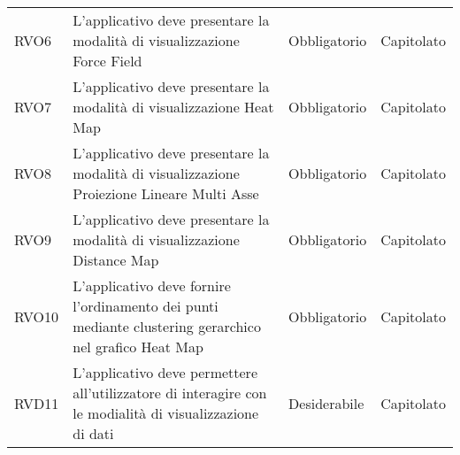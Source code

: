 \begin{longtable}[H]{|>{\raggedright\arraybackslash}p{20mm} | p{90mm} | p{22mm} | p{30mm} |}
    RVO6
        & L'applicativo deve presentare la modalità di visualizzazione Force Field
        & Obbligatorio
        & Capitolato \\

    RVO7
        & L'applicativo deve presentare la modalità di visualizzazione Heat Map
        & Obbligatorio
        & Capitolato \\

    RVO8
        & L'applicativo deve presentare la modalità di visualizzazione Proiezione Lineare Multi Asse
        & Obbligatorio
        & Capitolato \\

    RVO9
        & L'applicativo deve presentare la modalità di visualizzazione Distance Map
        & Obbligatorio
        & Capitolato \\

    RVO10
        & L'applicativo deve fornire l'ordinamento dei punti mediante clustering gerarchico nel grafico Heat Map
        & Obbligatorio
        & Capitolato \\

    RVD11
        & L'applicativo deve permettere all'utilizzatore di interagire con le modialità di visualizzazione di dati
        & Desiderabile
        & Capitolato \\

\end{longtable}
